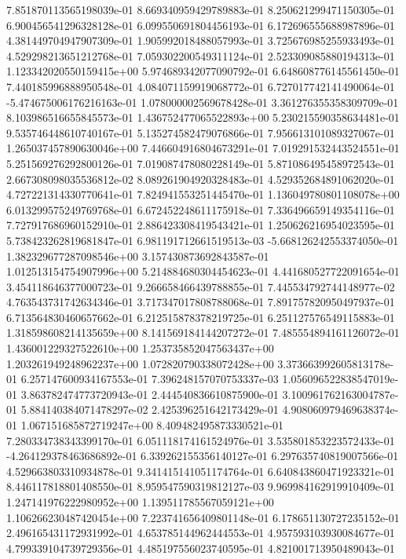 7.851870113565198039e-01
8.669340959429789883e-01
8.250621299471150305e-01
6.900456541296328128e-01
6.099550691804456193e-01
6.172696555688987896e-01
4.381449704947907309e-01
1.905992018488057993e-01
3.725676985255933493e-01
4.529298213651212768e-01
7.059302200549311124e-01
2.523309085880194313e-01
1.123342020550159415e+00
5.974689342077090792e-01
6.648608776145561450e-01
7.440185996888950548e-01
4.084071159919068772e-01
6.727017742141490064e-01
-5.474675006176216163e-01
1.078000002569678428e-01
3.361276355358309709e-01
8.103986516655845573e-01
1.436752477065522893e+00
5.230215590358634481e-01
9.535746448610740167e-01
5.135274582479076866e-01
7.956613101089327067e-01
1.265037457890630046e+00
7.446604916804673291e-01
7.019291532443524551e-01
5.251569276292800126e-01
7.019087478080228149e-01
5.871086495458972543e-01
2.667308098035536812e-02
8.089261904920328483e-01
4.529352684891062020e-01
4.727221314330770641e-01
7.824941553251445470e-01
1.136049780801108078e+00
6.013299575249769768e-01
6.672452248611175918e-01
7.336496659149354116e-01
7.727917686960152910e-01
2.886423308419543421e-01
1.250626216954023595e-01
5.738423262819681847e-01
6.981191712661519513e-03
-5.668126242553374050e-01
1.382329677287098546e+00
3.157430873692843587e-01
1.012513154754907996e+00
5.214884680304454623e-01
4.441680527722091654e-01
3.454118646377000723e-01
9.266658466439788855e-01
7.445534792744148977e-02
4.763543731742634346e-01
3.717347017808788068e-01
7.891757820950497937e-01
6.713564830460657662e-01
6.212515878378219725e-01
6.251127576549115883e-01
1.318598608214135659e+00
8.141569184144207272e-01
7.485554894161126072e-01
1.436001229327522610e+00
1.253735852047563437e+00
1.203261949248962237e+00
1.072820790338072428e+00
3.373663992605813178e-01
6.257147600934167553e-01
7.396248157070753337e-03
1.056096522838547019e-01
3.863782474773720943e-01
2.444540836610875900e-01
3.100961762163004787e-01
5.884140384071478297e-02
2.425396251642173429e-01
4.908060979469638374e-01
1.067151685872719247e+00
8.409482495873330521e-01
7.280334738343399170e-01
6.051118174161524976e-01
3.535801853223572433e-01
-4.264129378463686892e-01
6.339262155356140127e-01
6.297635740819007566e-01
4.529663803310934878e-01
9.341415141051174764e-01
6.640843860471923321e-01
8.446117818801408550e-01
8.959547590319812127e-03
9.969984162919910409e-01
1.247141976222980952e+00
1.139511785567059121e+00
1.106266230487420454e+00
7.223741656409801148e-01
6.178651130727235152e-01
2.496165431172931992e-01
4.653785144962444553e-01
4.957593103930084677e-01
4.799339104739729356e-01
4.485197556023740595e-01
4.821001713950489043e-01
